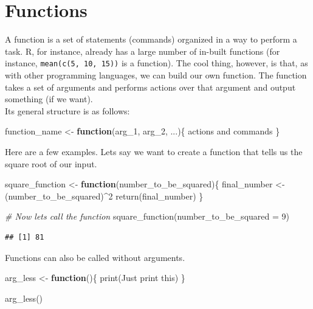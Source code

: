 \documentclass[
]{book}
\newenvironment{Shaded}{\begin{snugshade}}{\end{snugshade}}
\newcommand{\AttributeTok}[1]{\textcolor[rgb]{0.77,0.63,0.00}{#1}}
\newcommand{\CommentTok}[1]{\textcolor[rgb]{0.56,0.35,0.01}{\textit{#1}}}
\newcommand{\ControlFlowTok}[1]{\textcolor[rgb]{0.13,0.29,0.53}{\textbf{#1}}}
\newcommand{\DecValTok}[1]{\textcolor[rgb]{0.00,0.00,0.81}{#1}}
\newcommand{\FunctionTok}[1]{\textcolor[rgb]{0.00,0.00,0.00}{#1}}
\newcommand{\NormalTok}[1]{#1}
\newcommand{\OtherTok}[1]{\textcolor[rgb]{0.56,0.35,0.01}{#1}}
\newcommand{\SpecialCharTok}[1]{\textcolor[rgb]{0.00,0.00,0.00}{#1}}
\newcommand{\StringTok}[1]{\textcolor[rgb]{0.31,0.60,0.02}{#1}}
\begin{document}
\hypertarget{functions}{%
\section{Functions}\label{functions}}

A function is a set of statements (commands) organized in a way to perform a task.
R, for instance, already has a large number of in-built functions (for instance, \texttt{mean(c(5,\ 10,\ 15))} is a function).
The cool thing, however, is that, as with other programming languages, we can build our own function.
The function takes a set of arguments and performs actions over that argument and output something (if we want).\\

Its general structure is as follows:

\begin{Shaded}
\begin{Highlighting}[]
\NormalTok{function\_name }\OtherTok{\textless{}{-}} \ControlFlowTok{function}\NormalTok{(arg\_1, arg\_2, ...)\{}
\NormalTok{   actions and commands}
\NormalTok{\}}
\end{Highlighting}
\end{Shaded}

Here are a few examples.
Lets say we want to create a function that tells us the square root of our input.

\begin{Shaded}
\begin{Highlighting}[]
\NormalTok{square\_function }\OtherTok{\textless{}{-}} \ControlFlowTok{function}\NormalTok{(number\_to\_be\_squared)\{}
\NormalTok{  final\_number }\OtherTok{\textless{}{-}}\NormalTok{ (number\_to\_be\_squared)}\SpecialCharTok{\^{}}\DecValTok{2}
  \FunctionTok{return}\NormalTok{(final\_number)}
\NormalTok{\}}

\CommentTok{\# Now lets call the function}
\FunctionTok{square\_function}\NormalTok{(}\AttributeTok{number\_to\_be\_squared =} \DecValTok{9}\NormalTok{)}
\end{Highlighting}
\end{Shaded}

\begin{verbatim}
## [1] 81
\end{verbatim}

Functions can also be called without arguments.

\begin{Shaded}
\begin{Highlighting}[]
\NormalTok{arg\_less }\OtherTok{\textless{}{-}} \ControlFlowTok{function}\NormalTok{()\{}
  \FunctionTok{print}\NormalTok{(}\StringTok{\textquotesingle{}Just print this\textquotesingle{}}\NormalTok{)}
\NormalTok{\}}

\FunctionTok{arg\_less}\NormalTok{()}
\end{Highlighting}
\end{Shaded}
\end{document}
